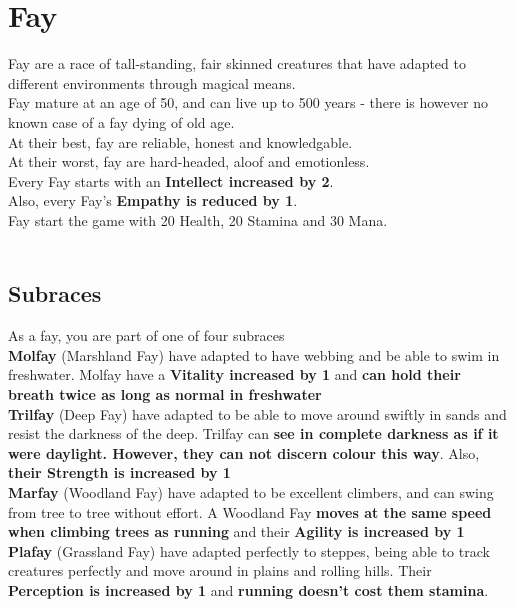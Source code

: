 \section{Fay}\label{race:fay}
Fay are a race of tall-standing, fair skinned creatures that have adapted to different environments through magical means.\\
Fay mature at an age of 50, and can live up to 500 years - there is however no known case of a fay dying of old age.\\
At their best, fay are reliable, honest and knowledgable.\\
At their worst, fay are hard-headed, aloof and emotionless.\\
Every Fay starts with an \textbf{Intellect increased by 2}.\\
Also, every Fay's \textbf{Empathy is reduced by 1}.\\
Fay start the game with 20 Health, 20 Stamina and 30 Mana.\\
\\ 
\subsection{Subraces}
As a fay, you are part of one of four subraces\\

\textbf{Molfay} (Marshland Fay) have adapted to have webbing and be able to swim in freshwater.
Molfay have a \textbf{Vitality increased by 1} and \textbf{can hold their breath twice as long as normal in freshwater}\\


\textbf{Trilfay} (Deep Fay) have adapted to be able to move around swiftly in sands and resist the darkness of the deep.
Trilfay can \textbf{see in complete darkness as if it were daylight. However, they can not discern colour this way}.
Also, \textbf{their Strength is increased by 1}\\


\textbf{Marfay} (Woodland Fay) have adapted to be excellent climbers, and can swing from tree to tree without effort.
A Woodland Fay \textbf{moves at the same speed when climbing trees as running} and their \textbf{Agility is increased by 1}\\


\textbf{Plafay} (Grassland Fay) have adapted perfectly to steppes, being able to track creatures perfectly and move around in plains and rolling hills.
Their \textbf{Perception is increased by 1} and \textbf{running doesn't cost them stamina}.